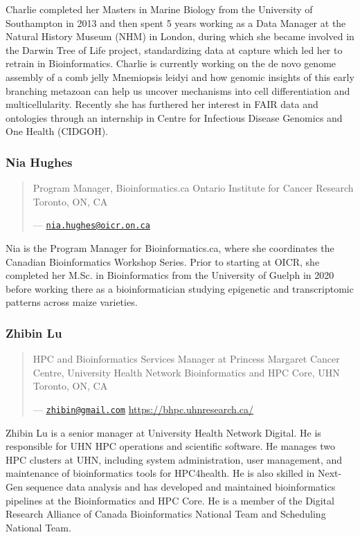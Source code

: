 \documentclass[
]{book}
\begin{document}
Charlie completed her Masters in Marine Biology from the University of Southampton in 2013
and then spent 5 years working as a Data Manager at the Natural History Museum (NHM) in
London, during which she became involved in the Darwin Tree of Life project, standardizing
data at capture which led her to retrain in Bioinformatics. Charlie is currently working on the de
novo genome assembly of a comb jelly Mnemiopsis leidyi and how genomic insights of this
early branching metazoan can help us uncover mechanisms into cell differentiation and
multicellularity. Recently she has furthered her interest in FAIR data and ontologies through an
internship in Centre for Infectious Disease Genomics and One Health (CIDGOH).

\subsubsection{Nia Hughes}\label{nia-hughes}

\begin{quote}
Program Manager, Bioinformatics.ca
Ontario Institute for Cancer Research
Toronto, ON, CA

--- \href{mailto:nia.hughes@oicr.on.ca}{\nolinkurl{nia.hughes@oicr.on.ca}}
\end{quote}

Nia is the Program Manager for Bioinformatics.ca, where she coordinates the Canadian
Bioinformatics Workshop Series. Prior to starting at OICR, she completed her M.Sc. in
Bioinformatics from the University of Guelph in 2020 before working there as a bioinformatician
studying epigenetic and transcriptomic patterns across maize varieties.

\subsubsection{Zhibin Lu}\label{zhibin-lu}

\begin{quote}
HPC and Bioinformatics Services Manager at Princess Margaret
Cancer Centre, University Health Network
Bioinformatics and HPC Core, UHN
Toronto, ON, CA

--- \href{mailto:zhibin@gmail.com}{\nolinkurl{zhibin@gmail.com}}
\url{https://bhpc.uhnresearch.ca/}
\end{quote}

Zhibin Lu is a senior manager at University Health Network Digital. He is responsible for UHN
HPC operations and scientific software. He manages two HPC clusters at UHN, including
system administration, user management, and maintenance of bioinformatics tools for
HPC4health. He is also skilled in Next-Gen sequence data analysis and has developed and
maintained bioinformatics pipelines at the Bioinformatics and HPC Core. He is a member of the
Digital Research Alliance of Canada Bioinformatics National Team and Scheduling National
Team.
\end{document}
